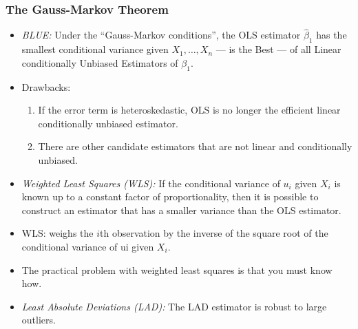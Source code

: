 

\begin{frame}
\frametitle{The Gauss-Markov Theorem}
\begin{itemize}
\item \emph{BLUE:} 
Under the ``Gauss-Markov conditions'', the OLS estimator $\hat{\beta}_{1}$ has the smallest conditional variance given $X_1, \ldots,X_n$ --- is the Best --- of all Linear conditionally Unbiased Estimators of $\beta_{1}$.
\item Drawbacks: 
\begin{enumerate}
\item If the error term is heteroskedastic, OLS is no longer the efficient linear conditionally unbiased estimator.
\item There are other candidate estimators that are not linear and conditionally unbiased.
\end{enumerate}
\item \emph{Weighted Least Squares (WLS):} If the conditional variance of $u_{i}$ given $X_{i}$ is known up to a constant factor of proportionality, then it is possible to construct an estimator that has a smaller variance than the OLS estimator.
\item WLS: weighs the $i$th observation by the inverse of the square root of the conditional variance of ui given $X_{i}$. 
\item The practical problem with weighted least squares is that you must know how.
\item \emph{Least Absolute Deviations (LAD):} The LAD estimator is robust to large outliers. 
\end{itemize}
\end{frame}
